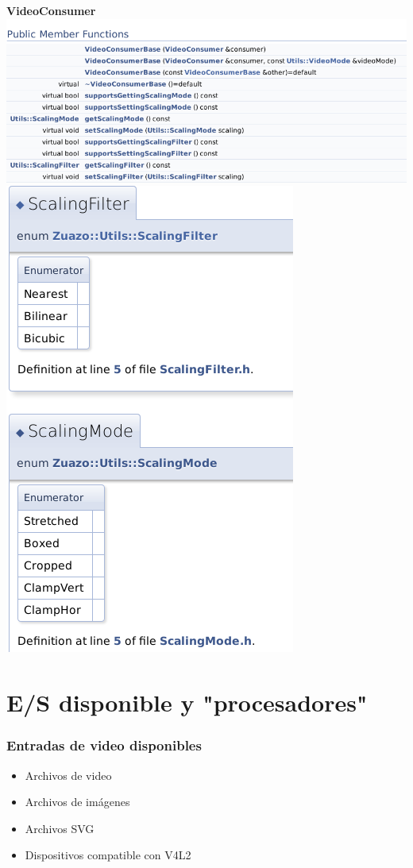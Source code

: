 \documentclass{beamer}
\begin{document}
\begin{frame}[allowframebreaks]
\begin{center}
	\center\large\bf VideoConsumer\\
	\includegraphics[width=\textwidth]{video_consumer} 
	\includegraphics[height=0.8\textheight]{scaling} 
\end{center}
\end{frame}

%
%
\section{E/S disponible y "procesadores"}

\begin{frame}[t] \frametitle{Entradas de video disponibles}
	\begin{itemize}
		\item{Archivos de video} \pause
		\item{Archivos de imágenes} \pause
		\item{Archivos SVG} \pause
		\item{Dispositivos compatible con V4L2}
	\end{itemize}
\end{frame}
\end{document}
